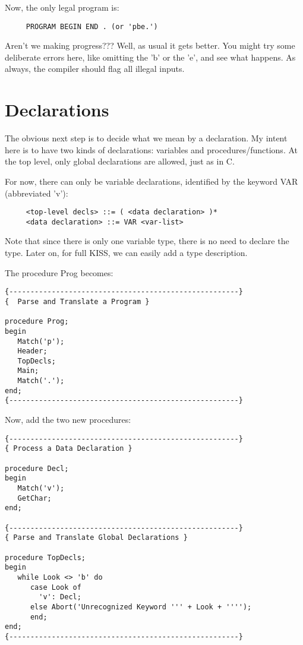 Now, the only legal program is:

\begin{verbatim}
     PROGRAM BEGIN END . (or 'pbe.')
\end{verbatim}

Aren't we making progress???  Well, as usual it gets better. You might try some deliberate errors here, like omitting  the  'b' or the 'e', and see what happens. As always, the  compiler  should flag all illegal inputs.


\section{Declarations}

The obvious next step is to decide what we mean by a declaration. My  intent  here  is to have two kinds of declarations: variables and  procedures/functions. At  the  top  level, only  global declarations are allowed, just as in C.

For now, there  can  only be variable declarations, identified by the keyword VAR (abbreviated 'v'):

\begin{verbatim}
     <top-level decls> ::= ( <data declaration> )*
     <data declaration> ::= VAR <var-list>
\end{verbatim}

Note that since there is only one variable type, there is no need to  declare the type. Later on, for full KISS, we can easily add a type description.

The procedure Prog becomes:

\begin{verbatim}
{------------------------------------------------------}
{  Parse and Translate a Program }

procedure Prog;
begin
   Match('p');
   Header;
   TopDecls;
   Main;
   Match('.');
end;
{------------------------------------------------------}
\end{verbatim}

Now, add the two new procedures:

\begin{verbatim}
{------------------------------------------------------}
{ Process a Data Declaration }

procedure Decl;
begin
   Match('v');
   GetChar;
end;

{------------------------------------------------------}
{ Parse and Translate Global Declarations }

procedure TopDecls;
begin
   while Look <> 'b' do
      case Look of
        'v': Decl;
      else Abort('Unrecognized Keyword ''' + Look + '''');
      end;
end;
{------------------------------------------------------}
\end{verbatim}

